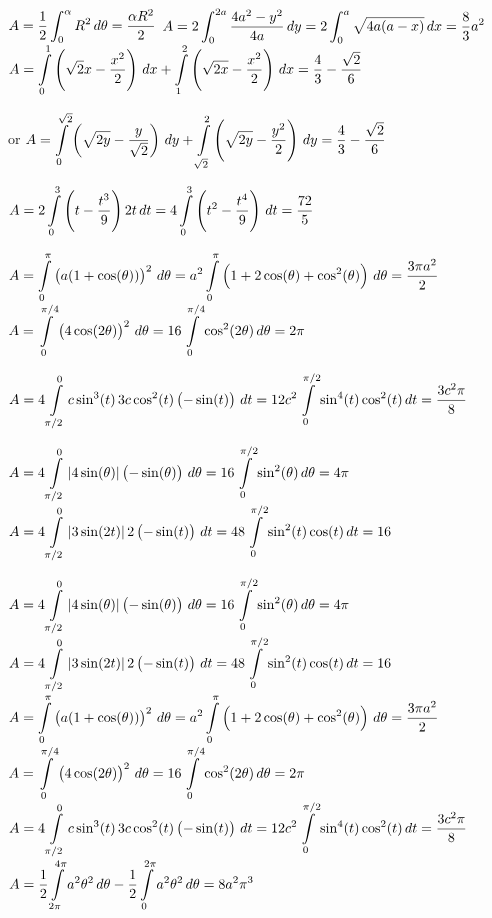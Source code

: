 \begin{Answer}
    
    \ifcalculus
    \Question $A=\displaystyle\dfrac{1}{2}\int_0^{\alpha} R^2\, d\theta = \dfrac{\alpha R^2}{2}$ 
    \Question $A=2\displaystyle\int_0^{2a} \dfrac{4a^2-y^2}{4a}\, dy = 2\int_0^a \sqrt{4a(a-x)}\, dx = \dfrac{8}{3}a^2$ 
    \Question $A = \displaystyle \int\limits_{0}^{1} \left( \sqrt{2}x - \dfrac{x^2}{2} \right) \, dx + \displaystyle \int\limits_{1}^{2} \left(\sqrt{2x} - \dfrac{x^2}{2} \right) \, dx = \dfrac{4}{3}- \dfrac{\sqrt{2}}{6}$ 
    
     or \quad  $A = \displaystyle \int\limits_{0}^{\sqrt{2}} \left( \sqrt{2y} - \dfrac{y}{\sqrt{2}} \right) \, dy + \displaystyle \int\limits_{\sqrt{2}}^{2} \left(\sqrt{2y} - \dfrac{y^2}{2} \right) \, dy = \dfrac{4}{3}- \dfrac{\sqrt{2}}{6}$ 
    \fi
    
    \Question $ A = 2 \displaystyle \int\limits_{0}^{3} \left(t - \dfrac{t^3}{9}  \right)2t \, dt   = 4 \displaystyle \int\limits_{0}^{3} \left(t^2 - \dfrac{t^4}{9}  \right)\, dt = \dfrac{72}{5} $
    
    \ifcalculus
    \Question $A=  \displaystyle \int\limits_{0}^{\pi} \left(a(1+\cos (\theta))\right)^2 \, d\theta = a^2\displaystyle \int\limits_{0}^{\pi} \left(1+2\cos (\theta) + \cos^2 (\theta) \right) \, d\theta  = \dfrac{3 \pi a^2}{2} $ 
    \Question $A= \displaystyle \int\limits_{0}^{\pi/4} \left(4\cos (2\theta)\right)^2 \, d\theta = 16\displaystyle \int\limits_{0}^{\pi/4} \cos^2 (2\theta) \, d\theta = 2 \pi $ 
    
    \Question $A= 4 \displaystyle \int\limits_{\pi/2}^{0} c \sin^3(t)\,3c \cos^2(t)\left(-\sin(t) \right)\, dt = 12 c^2 \displaystyle \int\limits_{0}^{\pi/2} \sin^4(t) \cos^2(t)\, dt =\dfrac{3 c^2 \pi}{8}$
    
    \Question $A = 4 \displaystyle \int\limits_{\pi/2}^{0} |4\sin (\theta)| \left(-\sin(\theta)\right)\, d\theta = 16 \displaystyle \int\limits_{0}^{\pi/2} \sin^2 (\theta)\, d\theta = 4 \pi $ 
    \Question $ A= 4 \displaystyle \int\limits_{\pi/2}^{0} |3\sin (2t)| \, 2 \left(-\sin (t)\right) \, dt  =48 \displaystyle \int\limits_{0}^{\pi/2} \sin^2 (t)\cos (t) \, dt = 16 $  
    \fi
    
    \ifanalysis
    \Question $A = 4 \displaystyle \int\limits_{\pi/2}^{0} |4\sin (\theta)| \left(-\sin(\theta)\right)\, d\theta = 16 \displaystyle \int\limits_{0}^{\pi/2} \sin^2 (\theta)\, d\theta = 4 \pi $ 
    \Question $ A= 4 \displaystyle \int\limits_{\pi/2}^{0} |3\sin (2t)| \, 2 \left(-\sin (t)\right) \, dt  =48 \displaystyle \int\limits_{0}^{\pi/2} \sin^2 (t)\cos (t) \, dt = 16 $
    \Question $A=  \displaystyle \int\limits_{0}^{\pi} \left(a(1+\cos (\theta))\right)^2 \, d\theta = a^2\displaystyle \int\limits_{0}^{\pi} \left(1+2\cos (\theta) + \cos^2 (\theta) \right) \, d\theta  = \dfrac{3 \pi a^2}{2} $ 
    \Question $A= \displaystyle \int\limits_{0}^{\pi/4} \left(4\cos (2\theta)\right)^2 \, d\theta = 16\displaystyle \int\limits_{0}^{\pi/4} \cos^2 (2\theta) \, d\theta = 2 \pi $ 
    \Question $A= 4 \displaystyle \int\limits_{\pi/2}^{0} c \sin^3(t)\,3c \cos^2(t)\left(-\sin(t) \right)\, dt = 12 c^2 \displaystyle \int\limits_{0}^{\pi/2} \sin^4(t) \cos^2(t)\, dt =\dfrac{3 c^2 \pi}{8}$
    \Question $A = \dfrac{1}{2} \displaystyle \int\limits_{2\pi}^{4\pi} a^2 \theta^2 \, d\theta - \dfrac{1}{2} \displaystyle \int\limits_{0}^{2\pi} a^2 \theta^2  \, d\theta = 8 a^2 \pi^3 $
    \fi
     

\end{Answer}
